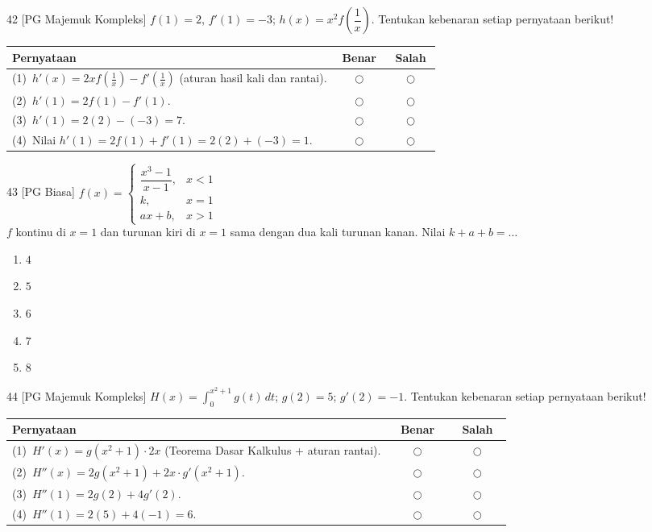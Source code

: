 \documentclass[11pt]{article}
\newenvironment{pilB}{%
  \par\smallskip\begin{multicols}{2}
  \begin{enumerate}[label=(\alph*),leftmargin=*,itemsep=1pt,topsep=3pt]}%
  {\end{enumerate}\end{multicols}}
\begin{document}
\begin{soal}{42 \normalfont\small[PG Majemuk Kompleks]}
$f(1)=2$, $f'(1)=-3$; $h(x)=x^2f\!\left(\dfrac{1}{x}\right)$.
Tentukan kebenaran setiap pernyataan berikut!

\par\smallskip
{\renewcommand{\arraystretch}{1.4}%
\begin{tabular}{@{}p{0.76\linewidth}cc@{}}
\hline\textbf{Pernyataan}&\textbf{Benar}&\textbf{Salah}\\\hline
(1)~$h'(x)=2xf\!\left(\tfrac1x\right)-f'\!\left(\tfrac1x\right)$ (aturan hasil kali dan rantai).&$\bigcirc$&$\bigcirc$\\
(2)~$h'(1)=2f(1)-f'(1)$.&$\bigcirc$&$\bigcirc$\\
(3)~$h'(1)=2(2)-(-3)=7$.&$\bigcirc$&$\bigcirc$\\
(4)~Nilai $h'(1)=2f(1)+f'(1)=2(2)+(-3)=1$.&$\bigcirc$&$\bigcirc$\\\hline
\end{tabular}}
\end{soal}

\begin{soal}{43 \normalfont\small[PG Biasa]}
$f(x)=\begin{cases}\dfrac{x^3-1}{x-1}, & x<1\\ k, & x=1\\ ax+b, & x>1\end{cases}$\\[0.5em]
$f$ kontinu di $x=1$ dan turunan kiri di $x=1$ sama dengan dua kali turunan
kanan. Nilai $k+a+b=\ldots$
\begin{pilB}
  \item $4$ \item $5$ \item $6$ \item $7$ \item $8$
\end{pilB}
\end{soal}

\begin{soal}{44 \normalfont\small[PG Majemuk Kompleks]}
$H(x)=\displaystyle\int_0^{x^2+1}g(t)\,dt$; $g(2)=5$; $g'(2)=-1$.
Tentukan kebenaran setiap pernyataan berikut!

\par\smallskip
{\renewcommand{\arraystretch}{1.4}%
\begin{tabular}{@{}p{0.76\linewidth}cc@{}}
\hline\textbf{Pernyataan}&\textbf{Benar}&\textbf{Salah}\\\hline
(1)~$H'(x)=g(x^2+1)\cdot2x$ (Teorema Dasar Kalkulus + aturan rantai).&$\bigcirc$&$\bigcirc$\\
(2)~$H''(x)=2g(x^2+1)+2x\cdot g'(x^2+1)$.&$\bigcirc$&$\bigcirc$\\
(3)~$H''(1)=2g(2)+4g'(2)$.&$\bigcirc$&$\bigcirc$\\
(4)~$H''(1)=2(5)+4(-1)=6$.&$\bigcirc$&$\bigcirc$\\\hline
\end{tabular}}
\end{soal}
\end{document}
